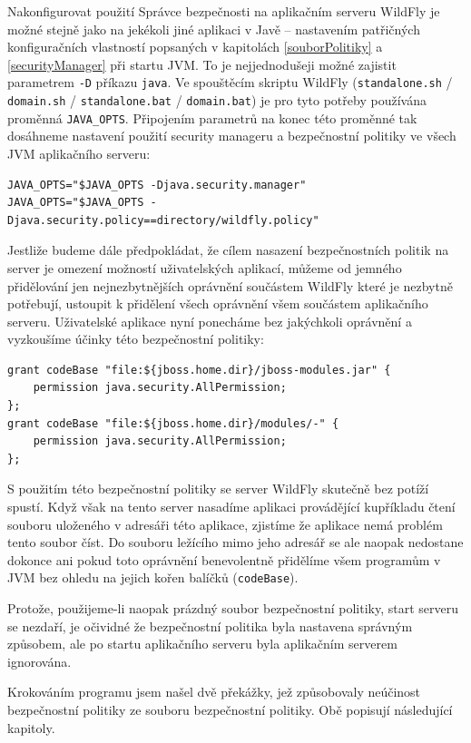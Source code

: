 Nakonfigurovat použití Správce bezpečnosti na aplikačním serveru WildFly je možné stejně jako na jekékoli jiné aplikaci v Javě -- nastavením patřičných konfiguračních vlastností popsaných v kapitolách \ref{souborPolitiky} a \ref{securityManager} při startu JVM. To je nejjednodušeji možné zajistit parametrem {\tt -D} příkazu {\tt java}. Ve spouštěcím skriptu WildFly ({\tt standalone.sh} / {\tt domain.sh} / {\tt standalone.bat} / {\tt domain.bat}) je pro tyto potřeby používána proměnná {\tt JAVA\_OPTS}. Připojením parametrů na konec této proměnné tak dosáhneme nastavení použití security manageru a bezpečnostní politiky ve všech JVM aplikačního serveru: \cite{jbossSecurityManager}

\begin{verbatim}
JAVA_OPTS="$JAVA_OPTS -Djava.security.manager"
JAVA_OPTS="$JAVA_OPTS -Djava.security.policy==directory/wildfly.policy"
\end{verbatim}

Jestliže budeme dále předpokládat, že cílem nasazení bezpečnostních politik na server je omezení možností uživatelských aplikací, můžeme od jemného přidělování jen nejnezbytnějších oprávnění součástem WildFly které je nezbytně potřebují, ustoupit k přidělení všech oprávnění všem součástem aplikačního serveru. Uživatelské aplikace nyní ponecháme bez jakýchkoli oprávnění a vyzkoušíme účinky této bezpečnostní politiky:

\begin{verbatim}
grant codeBase "file:${jboss.home.dir}/jboss-modules.jar" {
    permission java.security.AllPermission;
};
grant codeBase "file:${jboss.home.dir}/modules/-" {
    permission java.security.AllPermission;
};
\end{verbatim}

S použitím této bezpečnostní politiky se server WildFly skutečně bez potíží spustí. Když však na tento server nasadíme aplikaci provádějící kupříkladu čtení souboru uloženého v adresáři této aplikace, zjistíme že aplikace nemá problém tento soubor číst. Do souboru ležícího mimo jeho adresář se ale naopak nedostane dokonce ani pokud toto oprávnění benevolentně přidělíme všem programům v JVM bez ohledu na jejich kořen balíčků ({\tt codeBase}).

Protože, použijeme-li naopak prázdný soubor bezpečnostní politiky, start serveru se nezdaří, je očividné že bezpečnostní politika byla nastavena správným způsobem, ale po startu aplikačního serveru byla aplikačním serverem ignorována.

Krokováním programu jsem našel dvě překážky, jež způsobovaly neúčinost bezpečnostní politiky ze souboru bezpečnostní politiky. Obě popisují následující kapitoly.

